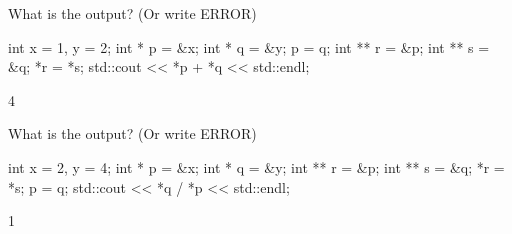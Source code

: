 

\nextq
What is the output? (Or write ERROR)
\begin{console}
int x = 1, y = 2;
int * p = &x;
int * q = &y;
p = q;
int ** r = &p;
int ** s = &q;
*r = *s;
std::cout << *p + *q << std::endl;
\end{console}
\ANSWER
\begin{answercode}
4
\end{answercode}

\nextq
What is the output? (Or write ERROR)
\begin{console}
int x = 2, y = 4;
int * p = &x;
int * q = &y;
int ** r = &p;
int ** s = &q;
*r = *s;
p = q;
std::cout << *q / *p << std::endl;
\end{console}
\ANSWER
\begin{answercode}
1
\end{answercode}


